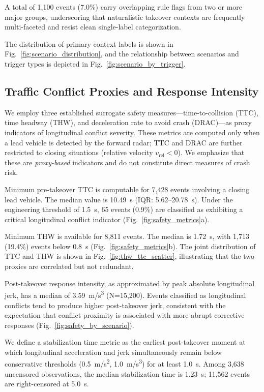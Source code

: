 A total of 1,100 events (7.0\%) carry overlapping rule flags from two or more major groups, underscoring that naturalistic takeover contexts are frequently multi-faceted and resist clean single-label categorization.

The distribution of primary context labels is shown in Fig.~\ref{fig:scenario_distribution}, and the relationship between scenarios and trigger types is depicted in Fig.~\ref{fig:scenario_by_trigger}.

\subsection{Traffic Conflict Proxies and Response Intensity}
\label{subsec:safety_proxies}

We employ three established surrogate safety measures---time-to-collision (TTC), time headway (THW), and deceleration rate to avoid crash (DRAC)---as proxy indicators of longitudinal conflict severity. These metrics are computed only when a lead vehicle is detected by the forward radar; TTC and DRAC are further restricted to closing situations (relative velocity $v_{\mathrm{rel}} < 0$). We emphasize that these are \emph{proxy-based} indicators and do not constitute direct measures of crash risk.

Minimum pre-takeover TTC is computable for 7,428 events involving a closing lead vehicle. The median value is \SI{10.49}{s} (IQR: 5.62--20.78~s). Under the engineering threshold of \SI{1.5}{s}, 65 events (0.9\%) are classified as exhibiting a critical longitudinal conflict indicator (Fig.~\ref{fig:safety_metrics}a).

Minimum THW is available for 8,811 events. The median is \SI{1.72}{s}, with 1,713 (19.4\%) events below \SI{0.8}{s} (Fig.~\ref{fig:safety_metrics}b). The joint distribution of TTC and THW is shown in Fig.~\ref{fig:thw_ttc_scatter}, illustrating that the two proxies are correlated but not redundant.

Post-takeover response intensity, as approximated by peak absolute longitudinal jerk, has a median of \SI{3.59}{m/s^3} (N=15,200). Events classified as longitudinal conflicts tend to produce higher post-takeover jerk, consistent with the expectation that conflict proximity is associated with more abrupt corrective responses (Fig.~\ref{fig:safety_by_scenario}).

We define a stabilization time metric as the earliest post-takeover moment at which longitudinal acceleration and jerk simultaneously remain below conservative thresholds (\SI{0.5}{m/s^2}, \SI{1.0}{m/s^3}) for at least \SI{1.0}{s}. Among 3,638 uncensored observations, the median stabilization time is \SI{1.23}{s}; 11,562 events are right-censored at \SI{5.0}{s}.

